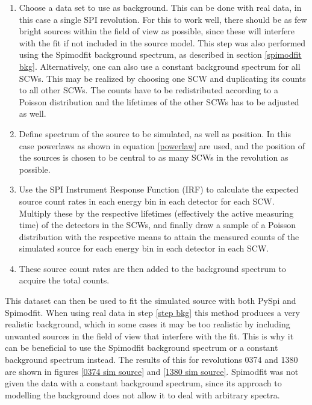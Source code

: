 \documentclass{article}
\begin{document}
\begin{enumerate}
    \item \label{step bkg}Choose a data set to use as background. This can be done with real data, in this case a single SPI revolution. For this to work well, there should be as few bright sources within the field of view as possible, since these will interfere with the fit if not included in the source model. This step was also performed using the Spimodfit background spectrum, as described in section \ref{spimodfit bkg}. Alternatively, one can also use a constant background spectrum for all SCWs. This may be realized by choosing one SCW and duplicating its counts to all other SCWs. The counts have to be  redistributed according to a Poisson distribution and the lifetimes of the other SCWs has to be adjusted as well. 
    
    \item Define spectrum of the source to be simulated, as well as position. In this case powerlaws as shown in equation \ref{powerlaw} are used, and the position of the sources is chosen to be central to as many SCWs in the revolution as possible.
    
    \item Use the SPI Instrument Response Function (IRF) to calculate the expected source count rates in each energy bin in each detector for each SCW. Multiply these by the respective lifetimes (effectively the active measuring time) of the detectors in the SCWs, and finally draw a sample of a Poisson distribution with the respective means to attain the measured counts of the simulated source for each energy bin in each detector in each SCW.
    
    \item These source count rates are then added to the background spectrum to acquire the total counts.
\end{enumerate}

This dataset can then be used to fit the simulated source with both PySpi and Spimodfit. When using real data in step \ref{step bkg} this method produces a very realistic background, which in some cases it may be too realistic by including unwanted sources in the field of view that interfere with the fit. This is why it can be beneficial to use the Spimodfit background spectrum or a constant background spectrum instead. The results of this for revolutions 0374 and 1380 are shown in figures \ref{0374 sim source} and \ref{1380 sim source}. Spimodfit was not given the data with a constant background spectrum, since its approach to modelling the background does not allow it to deal with arbitrary spectra. 
\end{document}
